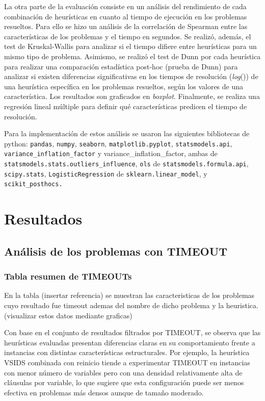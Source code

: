 La otra parte de la evaluaci\'on consiste en un an\'alisis del rendimiento de cada combinaci\'on de heur\'isticas en cuanto al tiempo de ejecuci\'on en los problemas resueltos. Para ello se hizo un an\'alisis de la correlaci\'on de Spearman entre las caracter\'isticas de los problemas y el tiempo en segundos. Se realiz\'o, adem\'as, el test de Kruskal-Wallis para analizar si el tiempo difiere entre heur\'isticas para un mismo tipo de problema. Asimismo, se realiz\'o el test de Dunn por cada heur\'istica para realizar una comparaci\'on estad\'istica post-hoc (prueba de Dunn) para analizar si existen diferencias significativas en los tiempos de resoluci\'on (\textit{log}()) de una heur\'istica espec\'ifica en los problemas resueltos, seg\'un los valores de una caracter\'istica. 
Los resultados son graficados en \textit{boxplot}. Finalmente, se realiza una regresi\'on lineal m\'ultiple para definir qu\'e caracter\'isticas predicen el tiempo de resoluci\'on.

Para la implementaci\'on de estos an\'alisis se usaron las siguientes bibliotecas de python: \texttt{pandas}, \texttt{numpy}, \texttt{seaborn}, \texttt{matplotlib.pyplot}, \texttt{statsmodels.api}, \texttt{variance\_inflation\_factor} y variance\_inflation\_factor, ambas de \texttt{statsmodels.stats.outliers\_influence}, \texttt{ols} de \texttt{statsmodels.formula.api}, \texttt{scipy.stats}, \texttt{LogisticRegression} de \texttt{sklearn.linear\_model}, y \texttt{scikit\_posthocs.}

\section{Resultados}
\subsection{An\'alisis de los problemas con TIMEOUT}

\subsubsection{Tabla resumen de TIMEOUTs}
En la tabla (insertar referencia) se muestran las caracteristicas de los problemas cuyo resultado fue timeout ademas del nombre de dicho problema y la heuristica. (visualizar estos datos mediante graficas)

Con base en el conjunto de resultados filtrados por TIMEOUT, se observa que las heurísticas evaluadas presentan diferencias claras en su comportamiento frente a instancias con distintas características estructurales. Por ejemplo, la heurística VSIDS combinada con reinicio tiende a experimentar TIMEOUT en instancias con menor número de variables pero con una densidad relativamente alta de cláusulas por variable, lo que sugiere que esta configuración puede ser menos efectiva en problemas más densos aunque de tamaño moderado. 

